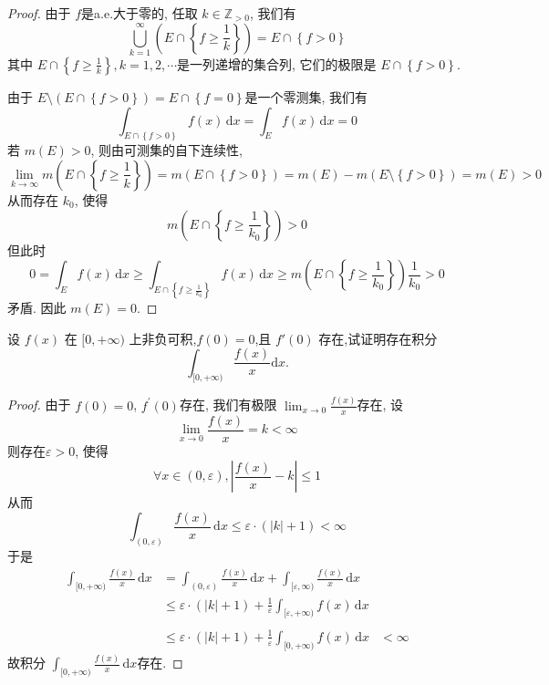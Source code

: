 \documentclass[../main.tex]{subfiles}
\begin{document}
\begin{proof}
    由于 \(  f  \)是a.e.大于零的, 任取 \(  k \in \mathbb{Z} _{> 0}  \), 我们有    \[
    \bigcup _{k= 1}^{\infty}\left( E\cap \left\{ f\ge \frac{1 }{k }  \right\} \right) = E\cap \left\{ f> 0 \right\}
    \]其中 \(  E\cap \left\{ f\ge \frac{1 }{k }  \right\},k = 1,2,\cdots   \)是一列递增的集合列, 它们的极限是 \(  E\cap \left\{ f> 0 \right\}  \). 
    
    由于 \(  E\setminus \left( E\cap \left\{ f> 0 \right\} \right)= E\cap \left\{ f= 0 \right\}   \)是一个零测集, 我们有 \[
    \int_{E\cap \left\{ f> 0 \right\}}f\left( x \right)\,\mathrm{d} x= \int_{E}f\left( x \right)\,\mathrm{d} x= 0  
    \] 若 \(  m\left( E \right)> 0   \), 则由可测集的自下连续性,  \[
    \lim_{k\to \infty}m\left( E\cap \left\{ f\ge \frac{1 }{k }  \right\} \right) = m\left( E \cap \left\{ f> 0 \right\}\right)=  m\left( E \right)-m\left( E\setminus \left\{ f> 0 \right\}\right)  = m\left( E \right)> 0 
    \] 从而存在 \(  k_0  \), 使得 \[
    m\left( E\cap \left\{ f\ge \frac{1 }{k_0 }  \right\} \right)> 0 
    \] 但此时 \[
    0= \int_{E}f\left( x \right)\,\mathrm{d} x \ge \int_{E\cap \left\{ f\ge \frac{1 }{k_0 }  \right\}} f\left( x \right)\,\mathrm{d} x\ge  m\left( E\cap \left\{ f\ge \frac{1 }{k_0 }  \right\} \right)\frac{1 }{k_0 }> 0   
    \]矛盾. 因此 \(  m\left( E \right)= 0   \). 
\end{proof}

\begin{exercise}{}{}
 设 $f(x)$ 在 $[0,+\infty)$ 上非负可积,$f(0)=0$,且 $f'(0)$ 存在,试证明存在积分
\[
\int_{[0,+\infty)} \frac{f(x)}{x} \mathrm{d}x.
\]

\end{exercise}
\begin{proof}
    由于 \(  f\left( 0 \right)= 0   \), \(  f^{\prime} \left( 0 \right)   \)存在, 我们有极限 \(  \lim_{x\to 0}\frac{f\left( x \right)  }{x }   \)存在, 设   
     \[
     \lim_{x\to 0}\frac{f\left( x \right)  }{x } = k< \infty
     \]则存在\(   \varepsilon > 0  \), 使得 \[
     \forall x\in (0, \varepsilon ),  \left|  \frac{f\left( x \right)  }{x }-k \right|\le 1  
     \] 从而 \[
     \int_{(0, \varepsilon )}\frac{f\left( x \right)  }{x }\,\mathrm{d} x\le   \varepsilon \cdot \left( \left| k \right|+ 1  \right)  < \infty
     \]于是 \[
  \begin{aligned}
     \int_{[0,+ \infty)}\frac{f\left( x \right)  }{x }\,\mathrm{d} x&=  \int_{\left( 0, \varepsilon  \right) }\frac{f\left( x \right)  }{x }\,\mathrm{d} x+  \int_{[ \varepsilon ,\infty)}\frac{f\left( x \right)  }{x }\,\mathrm{d} x   \\ 
      &\le  \varepsilon \cdot \left( \left| k \right|+ 1  \right)+ \frac{1 }{ \varepsilon  }  \int _{[ \varepsilon ,+ \infty)}f\left( x \right)\,\mathrm{d} x\\ \\ 
       &\le  \varepsilon \cdot \left( \left| k \right|+ 1  \right)+ \frac{1 }{ \varepsilon  }\int_{[0,+ \infty)}f\left( x \right)\,\mathrm{d} x   
       &< \infty   
  \end{aligned}
     \]故积分 \(  \int_{[0,+ \infty)}\frac{f\left( x \right)  }{x }\,\mathrm{d} x   \)存在. 
\end{proof}
\end{document}
